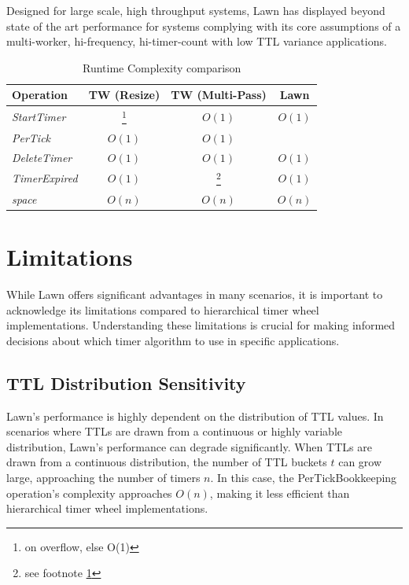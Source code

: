 \documentclass[conference]{IEEEtran}
\begin{document}
Designed for large scale, high throughput systems, Lawn has displayed beyond state of the art performance for systems complying with its core assumptions of a multi-worker, hi-frequency, hi-timer-count with low TTL variance applications.

\begin{table}[ht]
	\begin{center}
		\begin{tabular}{l|c|c|c}
			\textbf{Operation} & \textbf{TW (Resize)} & \textbf{TW (Multi-Pass)} & \textbf{Lawn} \\
			\hline
			\textit{StartTimer} & \boldmath{$O(n)$}\footnote{\label{overflowfn}on overflow, else O(1)} & $O(1)$ & $O(1)$ \\
			\textit{PerTick} & $O(1)$ & $O(1)$ & \boldmath{$O(t\sim1)$} \\
			\textit{DeleteTimer} & $O(1)$ & $O(1)$ & $O(1)$ \\
			\textit{TimerExpired} & $O(1)$ & \boldmath{$O(n)$}\footnote{see footnote \ref{overflowfn}} & $O(1)$ \\
			\textit{space} & $O(n)$ & $O(n)$ & $O(n)$ \\
		\end{tabular}
		\linebreak
		\caption{Runtime Complexity comparison}
	\end{center}
\end{table}

\section{Limitations}
While Lawn offers significant advantages in many scenarios, it is important to acknowledge its limitations compared to hierarchical timer wheel implementations. Understanding these limitations is crucial for making informed decisions about which timer algorithm to use in specific applications.

\subsection{TTL Distribution Sensitivity}
Lawn's performance is highly dependent on the distribution of TTL values. In scenarios where TTLs are drawn from a continuous or highly variable distribution, Lawn's performance can degrade significantly. When TTLs are drawn from a continuous distribution, the number of TTL buckets $t$ can grow large, approaching the number of timers $n$. In this case, the PerTickBookkeeping operation's complexity approaches $O(n)$, making it less efficient than hierarchical timer wheel implementations.
\end{document}
